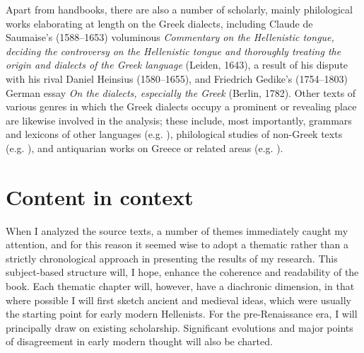 Apart from handbooks, there are also a number of scholarly, mainly philological works elaborating at length on the Greek dialects, including Claude de Saumaise’s (1588–1653) voluminous \textit{Commentary on the Hellenistic tongue, deciding the controversy on the Hellenistic tongue and thoroughly treating the origin and dialects of the Greek language} (Leiden, 1643), a result of his dispute with his rival Daniel Heinsius (1580–1655), and Friedrich Gedike’s (1754–1803) German essay \textit{On the dialects, especially the Greek} (Berlin, 1782). Other texts of various genres in which the Greek dialects occupy a prominent or revealing place are likewise involved in the analysis; these include, most importantly, grammars and lexicons of other languages (e.g. \citealt{Gill1619}), philological studies of non-Greek texts (e.g. \citealt{Schultens1748}), and antiquarian works on Greece or related areas (e.g. \citealt{Castelli1769}).

\section{Content in context}\label{sec:1.3}

When I analyzed the source texts, a number of themes immediately caught my attention, and for this reason it seemed wise to adopt a thematic rather than a strictly chronological approach in presenting the results of my research. This subject-based structure will, I hope, enhance the coherence and readability of the book. Each thematic chapter will, however, have a diachronic dimension, in that where possible I will first sketch ancient and medieval ideas, which were usually the starting point for early modern Hellenists. For the pre-Renaissance era, I will principally draw on existing scholarship. Significant evolutions and major points of disagreement in early modern thought will also be charted.

